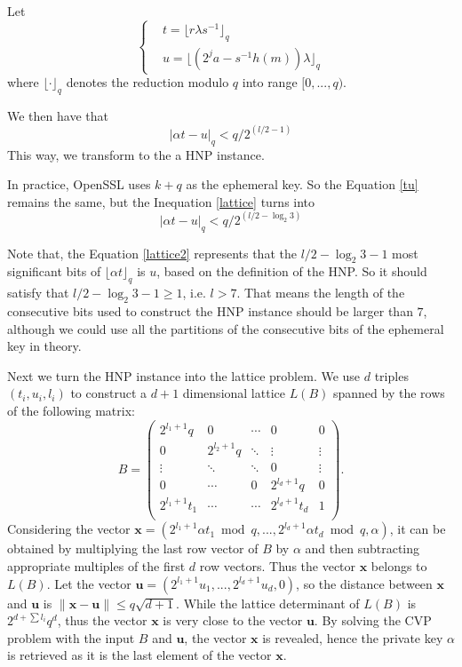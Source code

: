  Let
 \begin{equation}
 \label{tu}
 \left\{
 \begin{aligned}
 	&t = \lfloor r\lambda s^{-1} \rfloor_q    \\
 	&u = \lfloor (2^{j}a - s^{-1}h(m))\lambda \rfloor_q
 \end{aligned}
 \right.
 \end{equation}
 where $\lfloor \cdot\rfloor_q$ denotes the reduction modulo $q$ into range $[0, ..., q)$.

We then have that
 \begin{equation}
\label{lattice}
    |\alpha t - u|_q < q/2^{(l/2-1)}
\end{equation}
This way, we transform to the a HNP instance.

In practice, OpenSSL uses $k+q$ as the ephemeral key. So the Equation \ref{tu} remains the same, but the Inequation \ref{lattice} turns into
 \begin{equation}
\label{lattice2}
    |\alpha t - u|_q < q/2^{(l/2-\log_{2}{3})}
\end{equation}

Note that, the Equation \ref{lattice2} represents that the $l/2-\log_{2}{3} -1$ most significant bits of $\lfloor\alpha t\rfloor_q$ is $u$, based on the definition of the HNP.
So it should satisfy that $l/2-\log_{2}{3} -1 \geq 1$, i.e. $l > 7$.
That means the length of the consecutive bits used to  construct the HNP instance should be larger than $7$,
although we could use all the partitions of the consecutive bits of the ephemeral key in theory.

Next we turn the HNP instance into the lattice problem.
We use $d$ triples $(t_i, u_i, l_i)$ to construct a $d+1$ dimensional lattice $L(B)$ spanned by the rows of the following matrix:
$$B =
\left(
  \begin{array}{ccccc}
    2^{l_1+1}q & 0 & \cdots & 0 & 0 \\
    0 & 2^{l_2+1}q & \ddots & \vdots & \vdots \\
    \vdots & \ddots & \ddots & 0 & \vdots \\
    0 & \cdots & 0 & 2^{l_d+1}q & 0 \\
    2^{l_1+1}t_1 & \cdots & \cdots & 2^{l_d+1}t_d & 1 \\
  \end{array}
\right).
$$
Considering the vector $\textbf{x} = (2^{l_1+1}\alpha t_1 \bmod q, ..., 2^{l_d+1}\alpha t_d \bmod q, \alpha)$,
 it can be obtained by multiplying the last row vector of $B$ by $\alpha$ and then subtracting appropriate multiples of the first $d$ row vectors.
Thus the vector $\textbf{x}$ belongs to $L(B)$.
Let the vector $\textbf{u} = (2^{l_1+1}u_1, ..., 2^{l_d+1}u_d, 0)$,
 so the distance between $\textbf{x}$ and $\textbf{u}$ is $\|\textbf{x} - \textbf{u}\| \leq q\sqrt{d+1}$.
While the lattice determinant of $L(B)$ is $2^{d + \sum{l_i}}q^d$,
 thus the vector $\textbf{x}$ is very close to the vector $\textbf{u}$.
By solving the CVP problem with the input $B$ and $\textbf{u}$, the vector $\textbf{x}$ is revealed,
 hence the private key $\alpha$ is retrieved as it is the last element of the vector $\textbf{x}$.

